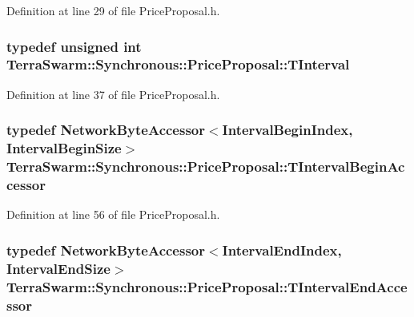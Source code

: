 Definition at line 29 of file Price\-Proposal.\-h.

\hypertarget{class_terra_swarm_1_1_synchronous_1_1_price_proposal_a37e6344d030c7695bb9cb341648928ee}{
\subsubsection[{T\-Interval}]{\setlength{\rightskip}{0pt plus 5cm}typedef unsigned int {\bf Terra\-Swarm\-::\-Synchronous\-::\-Price\-Proposal\-::\-T\-Interval}}}\label{class_terra_swarm_1_1_synchronous_1_1_price_proposal_a37e6344d030c7695bb9cb341648928ee}


Definition at line 37 of file Price\-Proposal.\-h.

\hypertarget{class_terra_swarm_1_1_synchronous_1_1_price_proposal_a4a52f34f0b7c60bfc0ca8656cd9c3c5d}{
\subsubsection[{T\-Interval\-Begin\-Accessor}]{\setlength{\rightskip}{0pt plus 5cm}typedef {\bf Network\-Byte\-Accessor}$<${\bf Interval\-Begin\-Index}, {\bf Interval\-Begin\-Size}$>$ {\bf Terra\-Swarm\-::\-Synchronous\-::\-Price\-Proposal\-::\-T\-Interval\-Begin\-Accessor}\hspace{0.3cm}{\ttfamily [private]}}}\label{class_terra_swarm_1_1_synchronous_1_1_price_proposal_a4a52f34f0b7c60bfc0ca8656cd9c3c5d}


Definition at line 56 of file Price\-Proposal.\-h.

\hypertarget{class_terra_swarm_1_1_synchronous_1_1_price_proposal_ad36cac35c047c96d50ecfb29504e9fd6}{
\subsubsection[{T\-Interval\-End\-Accessor}]{\setlength{\rightskip}{0pt plus 5cm}typedef {\bf Network\-Byte\-Accessor}$<${\bf Interval\-End\-Index}, {\bf Interval\-End\-Size}$>$ {\bf Terra\-Swarm\-::\-Synchronous\-::\-Price\-Proposal\-::\-T\-Interval\-End\-Accessor}\hspace{0.3cm}{\ttfamily [private]}}}\label{class_terra_swarm_1_1_synchronous_1_1_price_proposal_ad36cac35c047c96d50ecfb29504e9fd6}


